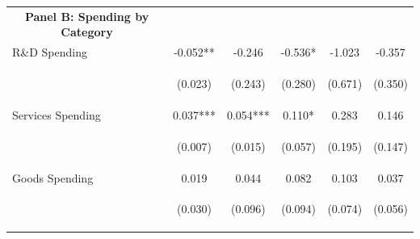\documentclass[dv_diss_main.tex]{subfiles}
\begin{document}
\begin{table}[H]
\begin{center}
{\begin{tabular}{lccccc}
    \multicolumn{1}{c}{\textbf{Panel B: Spending by Category}} \\ 
    
    R\&D Spending & -0.052** & -0.246 & -0.536* & -1.023 & -0.357 \\
    \vspace{4pt} & \begin{footnotesize}(0.023)\end{footnotesize} & \begin{footnotesize}(0.243)\end{footnotesize} & \begin{footnotesize}(0.280)\end{footnotesize} & \begin{footnotesize}(0.671)\end{footnotesize} & \begin{footnotesize}(0.350)\end{footnotesize} \\
    Services Spending & 0.037*** & 0.054*** & 0.110* & 0.283 & 0.146 \\
    \vspace{4pt} & \begin{footnotesize}(0.007)\end{footnotesize} & \begin{footnotesize}(0.015)\end{footnotesize} & \begin{footnotesize}(0.057)\end{footnotesize} & \begin{footnotesize}(0.195)\end{footnotesize} & \begin{footnotesize}(0.147)\end{footnotesize} \\
    Goods Spending & 0.019 & 0.044 & 0.082 & 0.103 & 0.037 \\
     & \begin{footnotesize}(0.030)\end{footnotesize} & \begin{footnotesize}(0.096)\end{footnotesize} & \begin{footnotesize}(0.094)\end{footnotesize} & \begin{footnotesize}(0.074)\end{footnotesize} & \begin{footnotesize}(0.056)\end{footnotesize} \\


\end{tabular}}
\end{center}
\end{table}
\end{document}
